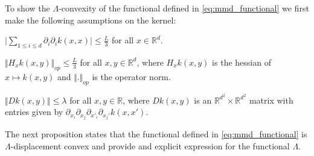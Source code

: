 To show the $\Lambda$-convexity of the functional defined in \cref{eq:mmd_functional} we first make the following assumptions on the kernel:
\begin{assumplist} 
\item \label{assump:bounded_trace} $ \vert \sum_{1\leq i\leq d} \partial_i\partial_ik(x,x) \vert\leq \frac{L}{3}  $ for all $x\in \mathbb{R}^d$.
\item \label{assump:bounded_hessian} $\Vert H_xk(x,y) \Vert_{op} \leq \frac{L}{3}$ for all $x,y\in \mathbb{R}^d$, where $H_xk(x,y)$ is the hessian of $x\mapsto k(x,y)$ and $\Vert.\Vert_{op}$ is the operator norm.
\item \label{assump:bounded_fourth_oder} $\Vert Dk(x,y) \Vert\leq \lambda  $ for all $x,y\in \mathbb{R}$, where $Dk(x,y)$ is an $\mathbb{R}^{d^2}\times \mathbb{R}^{d^2}$ matrix with entries given by $\partial_{x_{i}}\partial_{x_{j}}\partial_{x'_{i}}\partial_{x_{j}'}k(x,x')$.
\end{assumplist}
The next proposition states that the functional defined in \cref{eq:mmd_functional} is $\Lambda$-displacement convex and provide and explicit expression for the functional $\Lambda$.


